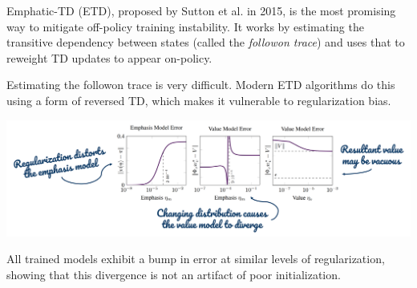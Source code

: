 Emphatic-TD (ETD), proposed by Sutton et al. in 2015, is the most promising way to mitigate off-policy training instability. It works by estimating the transitive dependency between states (called the \emph{followon trace}) and uses that to reweight TD updates to appear on-policy.

Estimating the followon trace is very difficult. Modern ETD algorithms do this using a form of reversed TD, which makes it vulnerable to regularization bias.
\begin{center}
    \includegraphics[scale=0.4]{parts/emphatic/emphatic.png}
\end{center}
All trained models exhibit a bump in error at similar levels of regularization, showing that this divergence is not an artifact of poor initialization.
